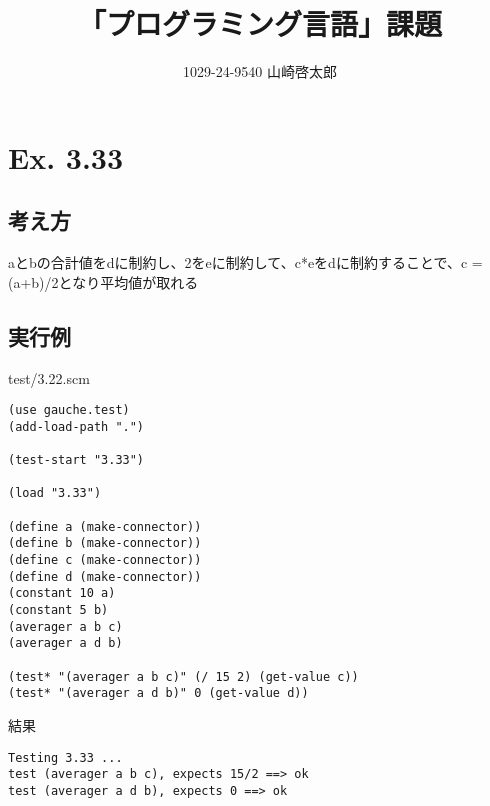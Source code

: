 \documentclass[a4paper,12pt]{article}
\title{「プログラミング言語」課題}
\author{1029-24-9540 山崎啓太郎}
\begin{document}
\lstset{numbers=left,basicstyle=\small}
\maketitle

\section{Ex. 3.33}
\subsection{考え方}
aとbの合計値をdに制約し、2をeに制約して、c*eをdに制約することで、c = (a+b)/2となり平均値が取れる
\subsection{実行例}
test/3.22.scm\\
{\small
\begin{verbatim}
(use gauche.test)
(add-load-path ".")

(test-start "3.33")

(load "3.33")

(define a (make-connector))
(define b (make-connector))
(define c (make-connector))
(define d (make-connector))
(constant 10 a)
(constant 5 b)
(averager a b c)
(averager a d b)

(test* "(averager a b c)" (/ 15 2) (get-value c))
(test* "(averager a d b)" 0 (get-value d))
\end{verbatim}
}

結果\\
{\small
\begin{verbatim}
Testing 3.33 ...                                                 
test (averager a b c), expects 15/2 ==> ok
test (averager a d b), expects 0 ==> ok
\end{verbatim}
}
\end{document}
